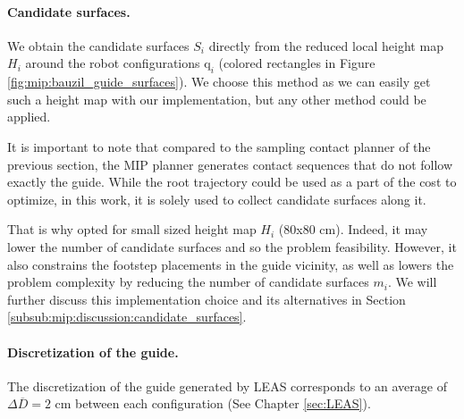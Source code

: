 
\paragraph{Candidate surfaces.}
We obtain the candidate surfaces $S_i$ directly from the reduced local height map $H_i$ around the robot configurations $\mbox{q}_i$ (colored rectangles in Figure \ref{fig:mip:bauzil_guide_surfaces}).
We choose this method as we can easily get such a height map with our implementation, but any other method could be applied.

It is important to note that compared to the sampling contact planner of the previous section, the MIP planner generates contact sequences that do not follow exactly the guide.
While the root trajectory could be used as a part of the cost to optimize, in this work, it is solely used to collect candidate surfaces along it.

That is why opted for small sized height map $H_i$ (80x80 cm). Indeed, it may lower the number of candidate surfaces and so the problem feasibility.
However, it also constrains the footstep placements in the guide vicinity, as well as lowers the problem complexity by reducing the number of candidate surfaces $m_i$.
We will further discuss this implementation choice and its alternatives in Section \ref{subsub:mip:discussion:candidate_surfaces}.




\paragraph{Discretization of the guide.}
The discretization of the guide generated by LEAS corresponds to an average of $\Delta \overline{D}=2$ cm between each configuration (See Chapter \ref{sec:LEAS}). 

